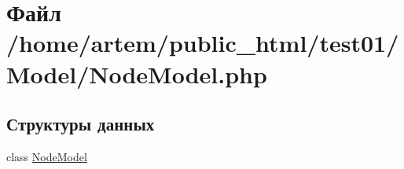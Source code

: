 \hypertarget{_node_model_8php}{\section{Файл /home/artem/public\-\_\-html/test01/\-Model/\-Node\-Model.php}
\label{_node_model_8php}
}
\subsection*{Структуры данных}
\begin{DoxyCompactItemize}
\item 
class \hyperlink{class_node_model}{Node\-Model}
\end{DoxyCompactItemize}
